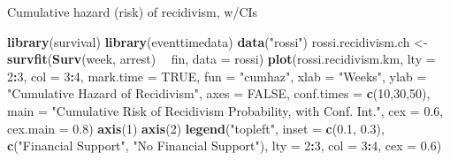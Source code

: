 \documentclass[ignorenonframetext,]{beamer}
\newenvironment{Shaded}{\begin{snugshade}}{\end{snugshade}}
\newcommand{\DataTypeTok}[1]{\textcolor[rgb]{0.13,0.29,0.53}{#1}}
\newcommand{\DecValTok}[1]{\textcolor[rgb]{0.00,0.00,0.81}{#1}}
\newcommand{\FloatTok}[1]{\textcolor[rgb]{0.00,0.00,0.81}{#1}}
\newcommand{\KeywordTok}[1]{\textcolor[rgb]{0.13,0.29,0.53}{\textbf{#1}}}
\newcommand{\NormalTok}[1]{#1}
\newcommand{\OperatorTok}[1]{\textcolor[rgb]{0.81,0.36,0.00}{\textbf{#1}}}
\newcommand{\OtherTok}[1]{\textcolor[rgb]{0.56,0.35,0.01}{#1}}
\newcommand{\StringTok}[1]{\textcolor[rgb]{0.31,0.60,0.02}{#1}}
\begin{document}
\begin{frame}[fragile]{%
\protect\hypertarget{cumulative-hazard-risk-of-recidivism-wcis}{%
Cumulative hazard (risk) of recidivism, w/CIs}}

\footnotesize

\begin{Shaded}
\begin{Highlighting}[]
\KeywordTok{library}\NormalTok{(survival)}
\KeywordTok{library}\NormalTok{(eventtimedata)}
\KeywordTok{data}\NormalTok{(}\StringTok{"rossi"}\NormalTok{)}
\NormalTok{rossi.recidivism.ch <-}\StringTok{ }\KeywordTok{survfit}\NormalTok{(}\KeywordTok{Surv}\NormalTok{(week, arrest) }\OperatorTok{~}\StringTok{ }\NormalTok{fin, }
                               \DataTypeTok{data =}\NormalTok{ rossi)}
\KeywordTok{plot}\NormalTok{(rossi.recidivism.km, }\DataTypeTok{lty =} \DecValTok{2}\OperatorTok{:}\DecValTok{3}\NormalTok{, }\DataTypeTok{col =} \DecValTok{3}\OperatorTok{:}\DecValTok{4}\NormalTok{, }\DataTypeTok{mark.time =} \OtherTok{TRUE}\NormalTok{, }
     \DataTypeTok{fun =} \StringTok{"cumhaz"}\NormalTok{,}
     \DataTypeTok{xlab =} \StringTok{"Weeks"}\NormalTok{, }
     \DataTypeTok{ylab =} \StringTok{"Cumulative Hazard of Recidivism"}\NormalTok{, }
     \DataTypeTok{axes =} \OtherTok{FALSE}\NormalTok{, }
     \DataTypeTok{conf.times =} \KeywordTok{c}\NormalTok{(}\DecValTok{10}\NormalTok{,}\DecValTok{30}\NormalTok{,}\DecValTok{50}\NormalTok{),}
     \DataTypeTok{main =} \StringTok{"Cumulative Risk of Recidivism Probability, }
\StringTok{     with Conf. Int."}\NormalTok{,}
     \DataTypeTok{cex =} \FloatTok{0.6}\NormalTok{, }\DataTypeTok{cex.main =} \FloatTok{0.8}\NormalTok{)}
\KeywordTok{axis}\NormalTok{(}\DecValTok{1}\NormalTok{)}
\KeywordTok{axis}\NormalTok{(}\DecValTok{2}\NormalTok{)}
\KeywordTok{legend}\NormalTok{(}\StringTok{"topleft"}\NormalTok{, }\DataTypeTok{inset =} \KeywordTok{c}\NormalTok{(}\FloatTok{0.1}\NormalTok{, }\FloatTok{0.3}\NormalTok{), }
       \KeywordTok{c}\NormalTok{(}\StringTok{"Financial Support"}\NormalTok{, }\StringTok{"No Financial Support"}\NormalTok{),}
       \DataTypeTok{lty =} \DecValTok{2}\OperatorTok{:}\DecValTok{3}\NormalTok{, }\DataTypeTok{col =} \DecValTok{3}\OperatorTok{:}\DecValTok{4}\NormalTok{, }\DataTypeTok{cex =} \FloatTok{0.6}\NormalTok{)}
\end{Highlighting}
\end{Shaded}

\end{frame}
\end{document}
